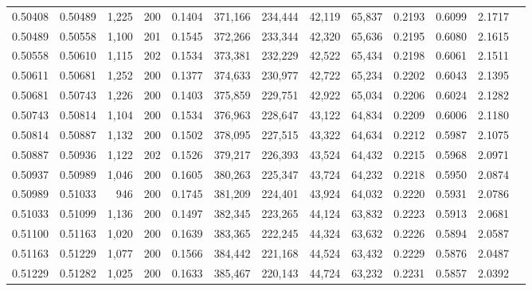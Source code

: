 \begin{tabular}{rrrrrrrrrrrrr}
0.50408 & 0.50489 & 1,225 & 200 &                                     0.1404 & 371,166 & 234,444 &  42,119 &  65,837 & 0.2193 & 0.6099 & 2.1717 \\
0.50489 & 0.50558 & 1,100 & 201 &                                     0.1545 & 372,266 & 233,344 &  42,320 &  65,636 & 0.2195 & 0.6080 & 2.1615 \\
0.50558 & 0.50610 & 1,115 & 202 &                                     0.1534 & 373,381 & 232,229 &  42,522 &  65,434 & 0.2198 & 0.6061 & 2.1511 \\
0.50611 & 0.50681 & 1,252 & 200 &                                     0.1377 & 374,633 & 230,977 &  42,722 &  65,234 & 0.2202 & 0.6043 & 2.1395 \\
0.50681 & 0.50743 & 1,226 & 200 &                                     0.1403 & 375,859 & 229,751 &  42,922 &  65,034 & 0.2206 & 0.6024 & 2.1282 \\
0.50743 & 0.50814 & 1,104 & 200 &                                     0.1534 & 376,963 & 228,647 &  43,122 &  64,834 & 0.2209 & 0.6006 & 2.1180 \\
0.50814 & 0.50887 & 1,132 & 200 &                                     0.1502 & 378,095 & 227,515 &  43,322 &  64,634 & 0.2212 & 0.5987 & 2.1075 \\
0.50887 & 0.50936 & 1,122 & 202 &                                     0.1526 & 379,217 & 226,393 &  43,524 &  64,432 & 0.2215 & 0.5968 & 2.0971 \\
0.50937 & 0.50989 & 1,046 & 200 &                                     0.1605 & 380,263 & 225,347 &  43,724 &  64,232 & 0.2218 & 0.5950 & 2.0874 \\
0.50989 & 0.51033 &   946 & 200 &                                     0.1745 & 381,209 & 224,401 &  43,924 &  64,032 & 0.2220 & 0.5931 & 2.0786 \\
0.51033 & 0.51099 & 1,136 & 200 &                                     0.1497 & 382,345 & 223,265 &  44,124 &  63,832 & 0.2223 & 0.5913 & 2.0681 \\
0.51100 & 0.51163 & 1,020 & 200 &                                     0.1639 & 383,365 & 222,245 &  44,324 &  63,632 & 0.2226 & 0.5894 & 2.0587 \\
0.51163 & 0.51229 & 1,077 & 200 &                                     0.1566 & 384,442 & 221,168 &  44,524 &  63,432 & 0.2229 & 0.5876 & 2.0487 \\
0.51229 & 0.51282 & 1,025 & 200 &                                     0.1633 & 385,467 & 220,143 &  44,724 &  63,232 & 0.2231 & 0.5857 & 2.0392 \\

\end{tabular}
